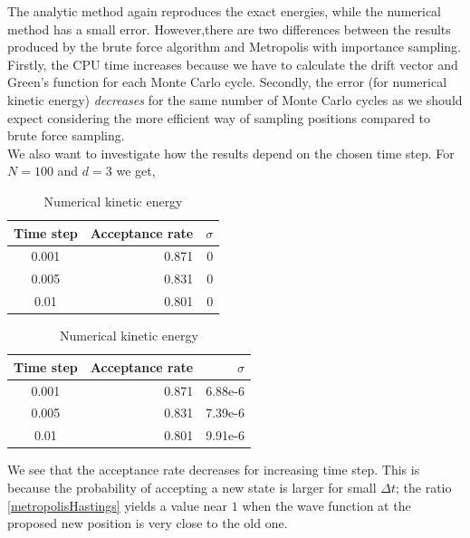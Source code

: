 \documentclass[english, a4paper]{article}
\begin{document}
The analytic method again reproduces the exact energies, while the numerical method has a small error. 
However,there are two differences between the results produced by the brute force algorithm and 
Metropolis with importance sampling.
Firstly, the CPU time increases because we have to calculate the drift vector and Green's function for 
each Monte Carlo cycle.
Secondly, the error (for numerical kinetic energy) \textit{decreases} for the same number of Monte Carlo cycles
as we should expect 
considering the more efficient
way of sampling positions compared to brute force sampling. \\

\noindent We also want to investigate how the results depend on the chosen time step.
For $N = 100$ and $d = 3$ we get,
\begin{table}[H]
  \begin{minipage}{.5\linewidth}
  \centering
  \begin{tabular}{ | c | r | r |}
    \hline
    Time step& Acceptance rate& $\sigma$ \\*
    \hline
    0.001& 0.871& 0 \\*
    \hline
    0.005& 0.831& 0 \\*
    \hline
    0.01&  0.801& 0 \\*
    \hline
  \end{tabular}
  \caption{Analytical kinetic energy}
  \label{tab:Tabell5}
  \end{minipage}
  \begin{minipage}{.5\linewidth}
   \centering
    \begin{tabular}{ | c | r | r |}
    \hline
    Time step& Acceptance rate& $\sigma$ \\*
    \hline
    0.001& 0.871& 6.88e-6 \\*
    \hline
    0.005& 0.831& 7.39e-6 \\*
    \hline
    0.01&  0.801& 9.91e-6 \\*
    \hline
  \end{tabular}
  \caption{Numerical kinetic energy}
  \label{tab:Tabell1}
  \end{minipage}
\end{table}
We see that the acceptance rate decreases for increasing time step. This is because
the probability of accepting a new state is larger for small $\Delta t$; the ratio
\eqref{metropolisHastings} yields a value near $1$ when the wave function at the proposed 
new position is very close to the old one. \\
\end{document}

